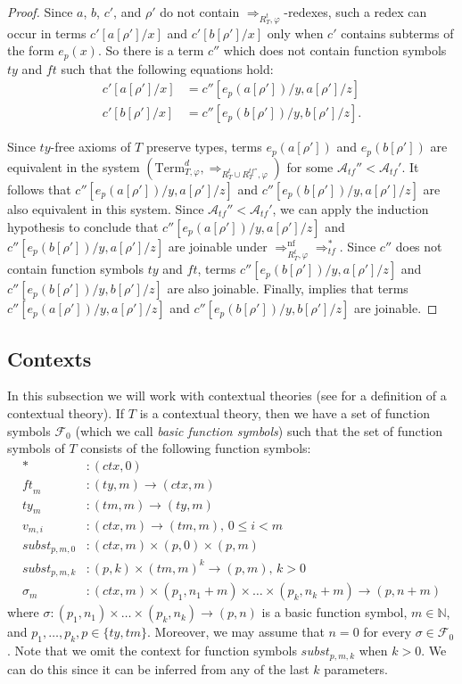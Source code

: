 \documentclass[reqno]{amsart}
\theoremstyle{definition}
\theoremstyle{remark}
\newcommand{\nf}{\mathrm{nf}}
\newcommand{\Term}{\mathrm{Term}}
\newcommand{\subst}{\mathit{subst}}
\newcommand{\ft}{\mathit{ft}}
\newcommand{\ty}{\mathit{ty}}
\newcommand{\ctx}{\mathit{ctx}}
\newcommand{\tm}{\mathit{tm}}
\numberwithin{figure}{section}
\begin{document}
\begin{proof}
Since $a$, $b$, $c'$, and $\rho'$ do not contain $\Rightarrow_{R_T^t,\varphi}$-redexes, such a redex can occur in terms $c'[a[\rho']/x]$ and $c'[b[\rho']/x]$ only when $c'$ contains subterms of the form $e_p(x)$.
So there is a term $c''$ which does not contain function symbols $\ty$ and $\ft$ such that the following equations hold:
\begin{align*}
c'[a[\rho']/x] & = c''[e_p(a[\rho'])/y,a[\rho']/z] \\
c'[b[\rho']/x] & = c''[e_p(b[\rho'])/y,b[\rho']/z].
\end{align*}

Since $\ty$-free axioms of $T$ preserve types, terms $e_p(a[\rho'])$ and $e_p(b[\rho'])$ are equivalent in the system $(\Term_{T,\varphi}^d,\Rightarrow_{R^t_T \cup R^{tf''}_T, \varphi})$ for some $\mathcal{A}_{tf}'' < \mathcal{A}_{tf}'$.
It follows that $c''[e_p(a[\rho'])/y,a[\rho']/z]$ and $c''[e_p(b[\rho'])/y,a[\rho']/z]$ are also equivalent in this system.
Since $\mathcal{A}_{tf}'' < \mathcal{A}_{tf}'$, we can apply the induction hypothesis to conclude that $c''[e_p(a[\rho'])/y,a[\rho']/z]$ and $c''[e_p(b[\rho'])/y,a[\rho']/z]$ are joinable under $\Rightarrow_{R_T^t,\varphi}^\nf \Rightarrow_{tf}^*$.
Since $c''$ does not contain function symbols $\ty$ and $\ft$, terms $c''[e_p(b[\rho'])/y,a[\rho']/z]$ and $c''[e_p(b[\rho'])/y,b[\rho']/z]$ are also joinable.
Finally,  implies that terms $c''[e_p(a[\rho'])/y,a[\rho']/z]$ and $c''[e_p(b[\rho'])/y,b[\rho']/z]$ are joinable.
\end{proof}

\subsection{Contexts}

In this subsection we will work with contextual theories (see \cite{alg-tt} for a definition of a contextual theory).
If $T$ is a contextual theory, then we have a set of function symbols $\mathcal{F}_0$ (which we call \emph{basic function symbols}) such that the set of function symbols of $T$ consists of the following function symbols:
\begin{align*}
* & : (\ctx,0) \\
\ft_m & : (\ty,m) \to (\ctx,m) \\
\ty_m & : (\tm,m) \to (\ty,m) \\
v_{m,i} & : (\ctx,m) \to (\tm,m) \text{, } 0 \leq i < m \\
\subst_{p,m,0} & : (\ctx,m) \times (p,0) \times (p,m) \\
\subst_{p,m,k} & : (p,k) \times (\tm,m)^k \to (p,m) \text{, } k > 0 \\
\sigma_m & : (\ctx,m) \times (p_1,n_1+m) \times \ldots \times (p_k,n_k+m) \to (p,n+m)
\end{align*}
where $\sigma : (p_1,n_1) \times \ldots \times (p_k,n_k) \to (p,n)$ is a basic function symbol, $m \in \mathbb{N}$, and $p_1, \ldots, p_k, p \in \{ \ty, \tm \}$.
Moreover, we may assume that $n = 0$ for every $\sigma \in \mathcal{F}_0$.
Note that we omit the context for function symbols $\subst_{p,m,k}$ when $k > 0$.
We can do this since it can be inferred from any of the last $k$ parameters.
\end{document}
